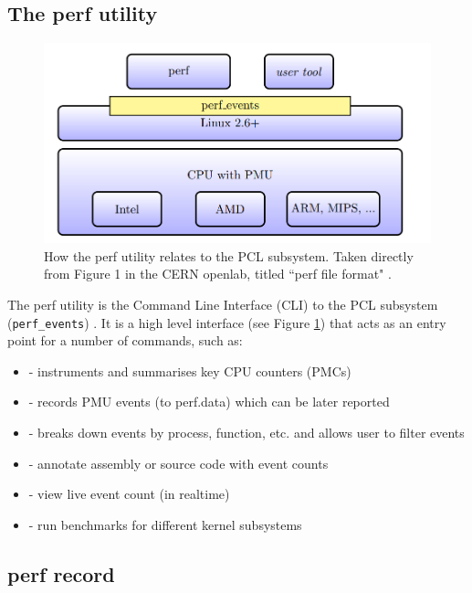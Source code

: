 \subsection{The perf utility}

\begin{figure}[!h]
\centering
    \includegraphics[width=0.8\linewidth]{report-a_perf_util_arch}
    \caption{How the perf utility relates to the PCL subsystem. Taken directly from Figure 1 in the CERN openlab, titled ``perf file format" \cite{CERN_openlab_perf_file_format}.}
    \label{fig:perf_util_arch}
\end{figure}

The perf utility is the Command Line Interface (CLI) to the PCL subsystem (\texttt{perf\_events}) \cite{ManPerfCLI}. It is a high level interface (see Figure \ref{fig:perf_util_arch}) that acts as an entry point for a number of commands, such as:

\ssp
\begin{itemize}
    \item {} - instruments and summarises key CPU counters (PMCs)
    \item {} - records PMU events (to perf.data) which can be later reported
    \item {} - breaks down events by process, function, etc. and allows user to filter events
    \item {} - annotate assembly or source code with event counts
    \item {} - view live event count (in realtime)
    \item {} - run benchmarks for different kernel subsystems
\end{itemize}
\dsp

\subsection{perf record}


